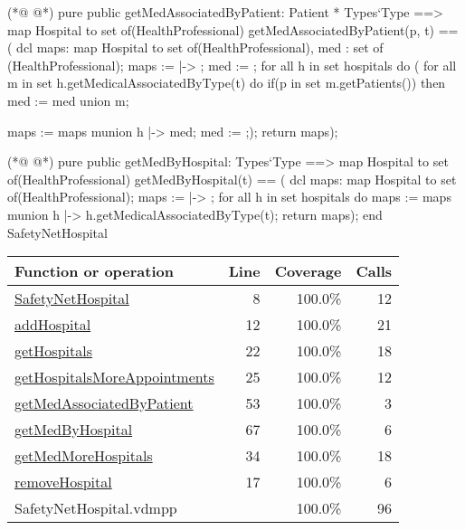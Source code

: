 \begin{vdmpp}[breaklines=true]
(*@
\label{getMedAssociatedByPatient:53}
@*)
 pure public getMedAssociatedByPatient: Patient * Types`Type ==> map Hospital to set of(HealthProfessional)
  getMedAssociatedByPatient(p, t) == (
                     dcl maps: map Hospital to set of(HealthProfessional), med : set of (HealthProfessional);
                     maps := { |-> };
                     med := {};
                     for all h in set hospitals do (
                      for all m in set h.getMedicalAssociatedByType(t) do
                       if(p in set m.getPatients())
                        then med := med union {m};
                       
                      maps := maps munion {h |-> med};
                      med := {};);
                      return maps);
 
(*@
\label{getMedByHospital:67}
@*)
 pure public getMedByHospital: Types`Type ==> map Hospital to set of(HealthProfessional)
  getMedByHospital(t) == (
                     dcl maps: map Hospital to set of(HealthProfessional);
                     maps := { |-> };
                     for all h in set hospitals do
                      maps := maps munion {h |-> h.getMedicalAssociatedByType(t)};
                     return maps);
end SafetyNetHospital
\end{vdmpp}
\bigskip
\begin{longtable}{|l|r|r|r|}
\hline
Function or operation & Line & Coverage & Calls \\
\hline
\hline
\hyperref[SafetyNetHospital:8]{SafetyNetHospital} & 8&100.0\% & 12 \\
\hline
\hyperref[addHospital:12]{addHospital} & 12&100.0\% & 21 \\
\hline
\hyperref[getHospitals:22]{getHospitals} & 22&100.0\% & 18 \\
\hline
\hyperref[getHospitalsMoreAppointments:25]{getHospitalsMoreAppointments} & 25&100.0\% & 12 \\
\hline
\hyperref[getMedAssociatedByPatient:53]{getMedAssociatedByPatient} & 53&100.0\% & 3 \\
\hline
\hyperref[getMedByHospital:67]{getMedByHospital} & 67&100.0\% & 6 \\
\hline
\hyperref[getMedMoreHospitals:34]{getMedMoreHospitals} & 34&100.0\% & 18 \\
\hline
\hyperref[removeHospital:17]{removeHospital} & 17&100.0\% & 6 \\
\hline
\hline
SafetyNetHospital.vdmpp & & 100.0\% & 96 \\
\hline
\end{longtable}

